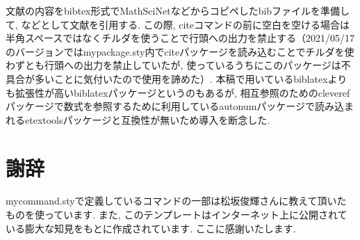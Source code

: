 \documentclass[11pt,a4paper,oneside,lualatex]{ltjsarticle} %
\numberwithin{equation}{section} %
\begin{document}

文献の内容をbibtex形式でMathSciNetなどからコピペしたbibファイルを準備して, \cite[定理 1.1]{AM}などとして文献を引用する.
この際, citeコマンドの前に空白を空ける場合は半角スペースではなくチルダを使うことで行頭への出力を禁止する（2021/05/17のバージョンではmypackage.sty内でciteパッケージを読み込むことでチルダを使わずとも行頭への出力を禁止していたが, 使っているうちにこのパッケージは不具合が多いことに気付いたので使用を諦めた）.
本稿で用いているbiblatexよりも拡張性が高いbiblatexパッケージというのもあるが, 相互参照のためのcleverefパッケージで数式を参照するために利用しているautonumパッケージで読み込まれるetextoolsパッケージと互換性が無いため導入を断念した. 


\section*{謝辞}


mycommand.styで定義しているコマンドの一部は松坂俊輝さんに教えて頂いたものを使っています.
また, このテンプレートはインターネット上に公開されている膨大な知見をもとに作成されています.
ここに感謝いたします.




\end{document}
